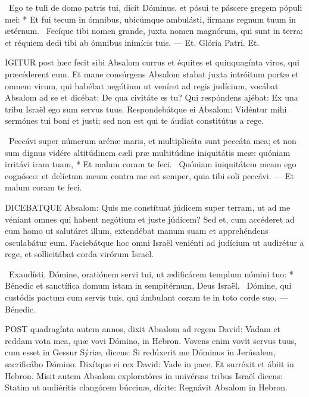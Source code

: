 \R\ Ego te tuli de domo patris tui, dicit Dóminus, et pósui te páscere gregem pópuli mei: * Et fui tecum in ómnibus, ubicúmque ambulásti, firmans regnum tuum in ætérnum. \V\ Fecíque tibi nomen grande, juxta nomen magnórum, qui sunt in terra: et réquiem dedi tibi ab ómnibus inimícis tuis. --- Et. Glória Patri. Et.




\lettrine[lines=2]{I}{GITUR} post hæc fecit sibi Absalom currus et équites et quinquagínta viros, qui præcéderent eum. Et mane consúrgens Absalom stabat juxta intróitum portæ et omnem virum, qui habébat negótium ut veníret ad regis judícium, vocábat Absalom ad se et dicébat: De qua civitáte es tu? Qui respóndens ajébat: Ex una tribu Israël ego sum servus tuus. Respondebátque ei Absalom: Vidéntur mihi sermónes tui boni et justi; sed non est qui te áudiat constitútus a rege.

\R\ Peccávi super númerum arénæ maris, et multiplicáta sunt peccáta mea; et non sum dignus vidére altitúdinem cæli præ multitúdine iniquitátis meæ: quóniam irritávi iram tuam, * Et malum coram te feci. \V\ Quóniam iniquitátem meam ego cognósco: et delíctum meum contra me est semper, quia tibi soli peccávi. --- Et malum coram te feci.


\lettrine[lines=2]{D}{ICEBATQUE} Absalom: Quis me constítuat júdicem super terram, ut ad me véniant omnes qui habent negótium et juste júdicem? Sed et, cum accéderet ad eum homo ut salutáret illum, extendébat manum suam et apprehéndens osculabátur eum. Faciebátque hoc omni Israël veniénti ad judícium ut audirétur a rege, et sollicitábat corda virórum Israël.

\R\ Exaudísti, Dómine, oratiónem servi tui, ut ædificárem templum nómini tuo: * Bénedic et sanctífica domum istam in sempitérnum, Deus Israël. \V\ Dómine, qui custódis pactum cum servis tuis, qui ámbulant coram te in toto corde suo. --- Bénedic.



\lettrine[lines=2]{P}{OST} quadragínta autem annos, dixit Absalom ad regem David: Vadam et reddam vota mea, quæ vovi Dómino, in Hebron. Vovens enim vovit servus tuus, cum esset in Gessur Sýriæ, dicens: Si redúxerit me Dóminus in Jerúsalem, sacrificábo Dómino. Dixítque ei rex David: Vade in pace. Et surréxit et ábiit in Hebron. Misit autem Absalom exploratóres in univérsas tribus Israël dicens: Statim ut audiéritis clangórem búccinæ, dícite: Regnávit Absalom in Hebron.

